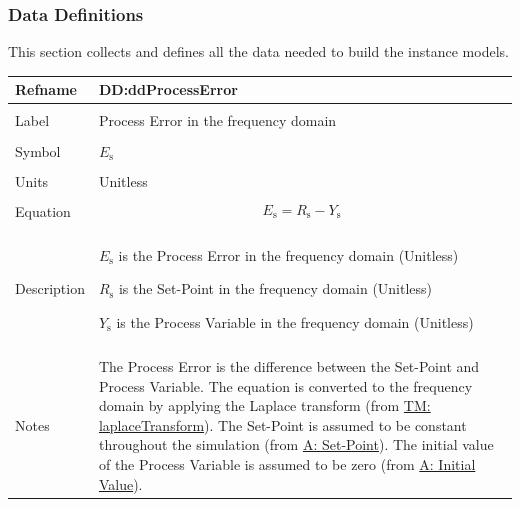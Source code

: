 \documentclass[12pt]{article}
\begin{document}
\subsubsection{Data Definitions}
\label{Sec:DDs}
This section collects and defines all the data needed to build the instance models.

\vspace{\baselineskip}
\noindent
\begin{minipage}{\textwidth}
\begin{tabular}{>{\raggedright}p{}>{\raggedright\arraybackslash}p{}}
\toprule \textbf{Refname} & \textbf{DD:ddProcessError}
\label{DD:ddProcessError}
\\ \midrule \\
Label & Process Error in the frequency domain
        
\\ \midrule \\
Symbol & ${E_{\text{s}}}$
         
\\ \midrule \\
Units & Unitless
        
\\ \midrule \\
Equation & \begin{displaymath}
           {E_{\text{s}}}={R_{\text{s}}}-{Y_{\text{s}}}
           \end{displaymath}
\\ \midrule \\
Description & \begin{symbDescription}
              \item{${E_{\text{s}}}$ is the Process Error in the frequency domain (Unitless)}
              \item{${R_{\text{s}}}$ is the Set-Point in the frequency domain (Unitless)}
              \item{${Y_{\text{s}}}$ is the Process Variable in the frequency domain (Unitless)}
              \end{symbDescription}
\\ \midrule \\
Notes & The Process Error is the difference between the Set-Point and Process Variable. The equation is converted to the frequency domain by applying the Laplace transform (from \hyperref[TM:laplaceTransform]{TM: laplaceTransform}). The Set-Point is assumed to be constant throughout the simulation (from \hyperref[setPoint]{A: Set-Point}). The initial value of the Process Variable is assumed to be zero (from \hyperref[initialValue]{A: Initial Value}).
        

\end{tabular}
\end{minipage}
\end{document}
